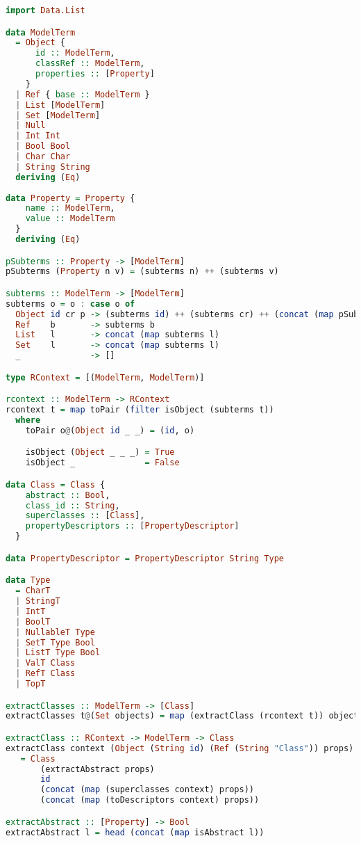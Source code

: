 \label{objects-to-classes}

\begin{lstlisting}[language=Haskell]
import Data.List

data ModelTerm
  = Object {
      id :: ModelTerm,
      classRef :: ModelTerm,
      properties :: [Property]
    }
  | Ref { base :: ModelTerm }
  | List [ModelTerm]
  | Set [ModelTerm]
  | Null
  | Int Int
  | Bool Bool
  | Char Char
  | String String
  deriving (Eq)
  
data Property = Property {
    name :: ModelTerm,
    value :: ModelTerm
  }
  deriving (Eq)

pSubterms :: Property -> [ModelTerm]
pSubterms (Property n v) = (subterms n) ++ (subterms v)

subterms :: ModelTerm -> [ModelTerm]
subterms o = o : case o of
  Object id cr p -> (subterms id) ++ (subterms cr) ++ (concat (map pSubterms p))
  Ref    b       -> subterms b
  List   l       -> concat (map subterms l)
  Set    l       -> concat (map subterms l)
  _              -> []  

type RContext = [(ModelTerm, ModelTerm)]

rcontext :: ModelTerm -> RContext
rcontext t = map toPair (filter isObject (subterms t))
  where
    toPair o@(Object id _ _) = (id, o)

    isObject (Object _ _ _) = True
    isObject _              = False

data Class = Class {
    abstract :: Bool, 
    class_id :: String, 
    superclasses :: [Class], 
    propertyDescriptors :: [PropertyDescriptor]
  }

data PropertyDescriptor = PropertyDescriptor String Type

data Type
  = CharT
  | StringT
  | IntT
  | BoolT
  | NullableT Type
  | SetT Type Bool
  | ListT Type Bool
  | ValT Class
  | RefT Class
  | TopT

extractClasses :: ModelTerm -> [Class]
extractClasses t@(Set objects) = map (extractClass (rcontext t)) objects

extractClass :: RContext -> ModelTerm -> Class
extractClass context (Object (String id) (Ref (String "Class")) props) 
   = Class 
       (extractAbstract props) 
       id 
       (concat (map (superclasses context) props)) 
       (concat (map (toDescriptors context) props))

extractAbstract :: [Property] -> Bool
extractAbstract l = head (concat (map isAbstract l))


\end{lstlisting}

